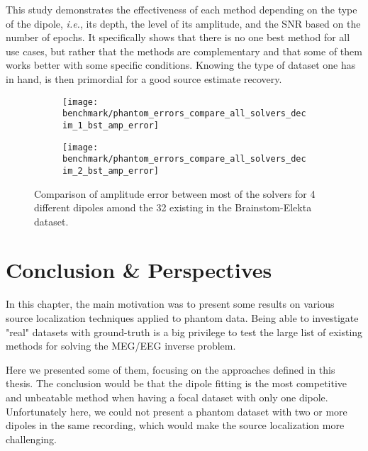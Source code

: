 This study demonstrates the effectiveness of each method depending on the type of the dipole, \textit{i.e.}, its depth, the level of its amplitude, and the SNR based on the number of epochs. It specifically shows that there is no one best method for all use cases, but rather that the methods are complementary and that some of them works better with some specific conditions. Knowing the type of dataset one has in hand, is then primordial for a good source estimate recovery.

\begin{figure}[p]
	\centering
    \begin{subfigure}{0.9\linewidth}
		\centering
		\texttt{[image: benchmark/phantom\_errors\_compare\_all\_solvers\_decim\_1\_bst\_amp\_error]}
	    \caption{\label{fig:all_solvers_amp_error_bst}}
    \end{subfigure}
	\hspace{5cm}
	\hfill
    \begin{subfigure}{0.9\linewidth}  
		\centering 
		\texttt{[image: benchmark/phantom\_errors\_compare\_all\_solvers\_decim\_2\_bst\_amp\_error]}
		\caption{\label{fig:all_solvers_amp_error_decim_2_bst}}
	\end{subfigure}

		\caption{Comparison of amplitude error between most of the solvers for 4 different dipoles amond the 32 existing in the Brainstom-Elekta dataset. \label{all_solvers_amp_error_bst}}
\end{figure}

\section{Conclusion \& Perspectives}
In this chapter, the main motivation was to present some results on various source localization techniques applied to phantom data. Being able to investigate "real" datasets with ground-truth is a big privilege to test the large list of existing methods for solving the MEG/EEG inverse problem.

Here we presented some of them, focusing on the approaches defined in this thesis. The conclusion would be that the dipole fitting is the most competitive and unbeatable method when having a focal dataset with only one dipole. Unfortunately here, we could not present a phantom dataset with two or more dipoles in the same recording, which would make the source localization more challenging.

